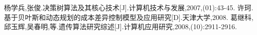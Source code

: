 \documentclass[utf8]{ctexart} %
\begin{document}
		\renewcommand\refname{参考文献}
		\begin{thebibliography}{100}%
				杨学兵,张俊.决策树算法及其核心技术[J].计算机技术与发展,2007,(01):43-45.
				许珂.基于贝叶斯和动态规划的成本差异控制模型及应用研究[D].天津大学,2008.
				葛继科,邱玉辉,吴春明,等.遗传算法研究综述[J].计算机应用研究,2008,(10):2911-2916.
		\end{thebibliography}  
\end{document}
